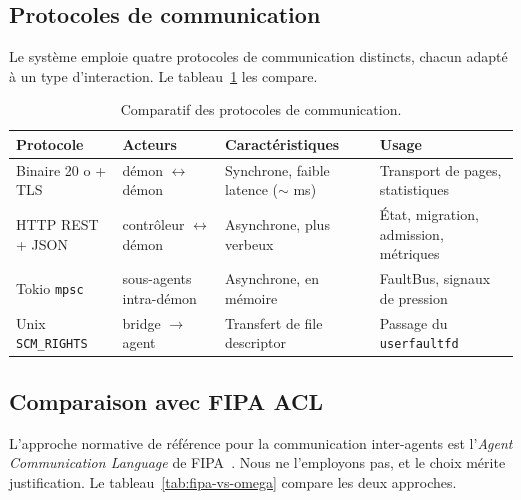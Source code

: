 \subsection{Protocoles de communication}

Le système emploie quatre protocoles de communication distincts, chacun adapté à un type d'interaction. Le tableau~\ref{tab:protocoles-sma} les compare.

\begin{table}[H]
\centering
\small
\caption{Comparatif des protocoles de communication.}
\begin{tabular}{p{3cm}p{2.8cm}p{3.2cm}p{4cm}}
\toprule
\textbf{Protocole} & \textbf{Acteurs} & \textbf{Caractéristiques} & \textbf{Usage} \\
\midrule
Binaire 20 o + TLS    & démon $\leftrightarrow$ démon     & Synchrone, faible latence ($\sim$ ms) & Transport de pages, statistiques \\
HTTP REST + JSON      & contrôleur $\leftrightarrow$ démon & Asynchrone, plus verbeux             & État, migration, admission, métriques \\
Tokio \texttt{mpsc}   & sous-agents intra-démon            & Asynchrone, en mémoire               & FaultBus, signaux de pression \\
Unix \texttt{SCM\_RIGHTS} & bridge $\to$ agent             & Transfert de file descriptor          & Passage du \texttt{userfaultfd} \\
\bottomrule
\end{tabular}

\label{tab:protocoles-sma}
\end{table}

\subsection{Comparaison avec FIPA ACL}

L'approche normative de référence pour la communication inter-agents est l'\emph{Agent Communication Language} de FIPA~\cite{fipa_spec_2002}. Nous ne l'employons pas, et le choix mérite justification. Le tableau~\ref{tab:fipa-vs-omega} compare les deux approches.

